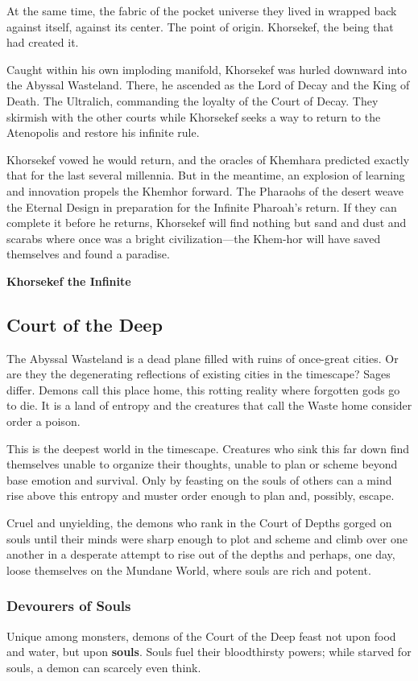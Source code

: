 \documentclass[10pt,a4paper,twoside,bg=print,twocolumn,openany,nodeprecatedcode]{dndbook}
\begin{document}
At the same time, the fabric of the pocket universe they lived in wrapped back against itself, against its center. The point of origin. Khorsekef, the being that had created it.

Caught within his own imploding manifold, Khorsekef was hurled downward into the Abyssal Wasteland. There, he ascended as the Lord of Decay and the King of Death. The Ultralich, commanding the loyalty of the Court of Decay. They skirmish with the other courts while Khorsekef seeks a way to return to the Atenopolis and restore his infinite rule.

Khorsekef vowed he would return, and the oracles of Khemhara predicted exactly that for the last several millennia. But in the meantime, an explosion of learning and innovation propels the Khemhor forward. The Pharaohs of the desert weave the Eternal Design in preparation for the Infinite Pharoah's return. If they can complete it before he returns, Khorsekef will find nothing but sand and dust and scarabs where once was a bright civilization—the Khem-hor will have saved themselves and found a paradise.

\textbf{Khorsekef the Infinite}

\subsection{Court of the Deep}
The Abyssal Wasteland is a dead plane filled with ruins of once-great cities. Or are they the degenerating reflections of existing cities in the timescape? Sages differ. Demons call this place home, this rotting reality where forgotten gods go to die. It is a land of entropy and the creatures that call the Waste home consider order a poison.

This is the deepest world in the timescape. Creatures who sink this far down find themselves unable to organize their thoughts, unable to plan or scheme beyond base emotion and survival. Only by feasting on the souls of others can a mind rise above this entropy and muster order enough to plan and, possibly, escape.

Cruel and unyielding, the demons who rank in the Court of Depths gorged on souls until their minds were sharp enough to plot and scheme and climb over one another in a desperate attempt to rise out of the depths and perhaps, one day, loose themselves on the Mundane World, where souls are rich and potent.

\subsubsection{Devourers of Souls}
Unique among monsters, demons of the Court of the Deep feast not upon food and water, but upon \textbf{souls}. Souls fuel their bloodthirsty powers; while starved for souls, a demon can scarcely even think.
\end{document}

